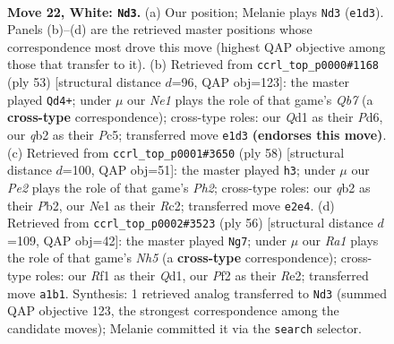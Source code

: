 \documentclass[11pt]{article}
\begin{document}
\clearpage

\begin{figure}[p]\centering
\begin{subfigure}{0.46\textwidth}\centering
\resizebox{\linewidth}{!}{%
\newchessgame
\chessboard[
  setfen={1nb1k3/8/8/ppb2p2/8/6r1/Pq2PPB1/R2QNRK1 w - - 0 22},
  showmover=false,
  pgfstyle=straightmove, color=movearrow, markmove={e1-d3}
]}
\caption{}
\end{subfigure}\hfill
\begin{subfigure}{0.46\textwidth}\centering
\resizebox{\linewidth}{!}{%
\newchessgame
\chessboard[
  setfen={1r3rk1/pp3pb1/3p2R1/2p4Q/2B1P3/8/PqP5/3K3R b - - 1 27},
  showmover=false,
  pgfstyle=straightmove, color=movearrow, markmove={b2-d4}
]}
\caption{}
\end{subfigure}
\\[4pt]
\begin{subfigure}{0.46\textwidth}\centering
\resizebox{\linewidth}{!}{%
\newchessgame
\chessboard[
  setfen={1r2b1k1/6p1/4p2p/8/p2PBr1q/4Q3/PPR2P1P/4R1K1 w - - 2 30},
  showmover=false,
  pgfstyle=straightmove, color=movearrow, markmove={h2-h3}
]}
\caption{}
\end{subfigure}\hfill
\begin{subfigure}{0.46\textwidth}\centering
\resizebox{\linewidth}{!}{%
\newchessgame
\chessboard[
  setfen={6rk/pp5p/3p4/5r1N/2Pp4/4qP2/PP2RR2/3Q2K1 w - - 3 29},
  showmover=false,
  pgfstyle=straightmove, color=movearrow, markmove={h5-g7}
]}
\caption{}
\end{subfigure}
\caption{\textbf{Move 22, White: \texttt{Nd3}.} (a) Our position; Melanie plays \texttt{Nd3} (\texttt{e1d3}). Panels (b)--(d) are the retrieved master positions whose correspondence most drove this move (highest QAP objective among those that transfer to it). (b) Retrieved from \texttt{ccrl\_top\_p0000\#1168} (ply 53) [structural distance $d$=96, QAP obj=123]: the master played \texttt{Qd4+}; under $\mu$ our \emph{Ne1} plays the role of that game's \emph{Qb7} (a \textbf{cross-type} correspondence); cross-type roles: our \emph{Q}d1 as their \emph{P}d6, our \emph{q}b2 as their \emph{P}c5; transferred move \texttt{e1d3} \textbf{(endorses this move)}. (c) Retrieved from \texttt{ccrl\_top\_p0001\#3650} (ply 58) [structural distance $d$=100, QAP obj=51]: the master played \texttt{h3}; under $\mu$ our \emph{Pe2} plays the role of that game's \emph{Ph2}; cross-type roles: our \emph{q}b2 as their \emph{P}b2, our \emph{N}e1 as their \emph{R}c2; transferred move \texttt{e2e4}. (d) Retrieved from \texttt{ccrl\_top\_p0002\#3523} (ply 56) [structural distance $d$=109, QAP obj=42]: the master played \texttt{Ng7}; under $\mu$ our \emph{Ra1} plays the role of that game's \emph{Nh5} (a \textbf{cross-type} correspondence); cross-type roles: our \emph{R}f1 as their \emph{Q}d1, our \emph{P}f2 as their \emph{R}e2; transferred move \texttt{a1b1}. Synthesis: 1 retrieved analog transferred to \texttt{Nd3} (summed QAP objective 123, the strongest correspondence among the candidate moves); Melanie committed it via the \texttt{search} selector.}
\label{fig:thought-m42}
\end{figure}
\end{document}
